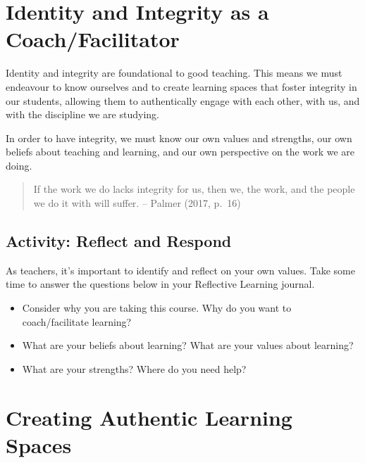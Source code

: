 \documentclass[
]{book}
\providecommand{\tightlist}{%
  \setlength{\itemsep}{0pt}\setlength{\parskip}{0pt}}
\begin{document}
\hypertarget{identity-and-integrity-as-a-coachfacilitator}{%
\section{Identity and Integrity as a Coach/Facilitator}\label{identity-and-integrity-as-a-coachfacilitator}}

Identity and integrity are foundational to good teaching. This means we must endeavour to know ourselves and to create learning spaces that foster integrity in our students, allowing them to authentically engage with each other, with us, and with the discipline we are studying.

In order to have integrity, we must know our own values and strengths, our own beliefs about teaching and learning, and our own perspective on the work we are doing.

\begin{quote}
If the work we do lacks integrity for us, then we, the work, and the people we do it with will suffer. -- Palmer (2017, p.~16)
\end{quote}

\hypertarget{activity-reflect-and-respond}{%
\subsection*{Activity: Reflect and Respond}\label{activity-reflect-and-respond}}

\begin{reflect}
As teachers, it's important to identify and reflect on your own values.
Take some time to answer the questions below in your Reflective Learning
journal.

\begin{itemize}
\tightlist
\item
  Consider why you are taking this course. Why do you want to
  coach/facilitate learning?\\
\item
  What are your beliefs about learning? What are your values about
  learning?\\
\item
  What are your strengths? Where do you need help?
\end{itemize}
\end{reflect}

\hypertarget{creating-authentic-learning-spaces}{%
\section{Creating Authentic Learning Spaces}\label{creating-authentic-learning-spaces}}
\end{document}
